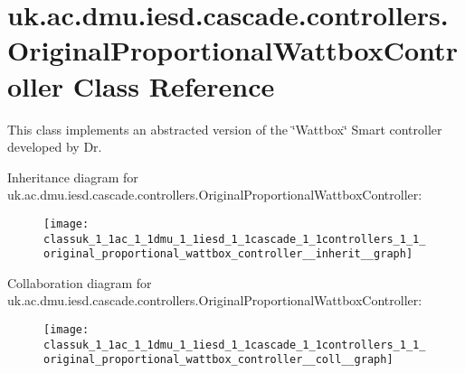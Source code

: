 \hypertarget{classuk_1_1ac_1_1dmu_1_1iesd_1_1cascade_1_1controllers_1_1_original_proportional_wattbox_controller}{\section{uk.\-ac.\-dmu.\-iesd.\-cascade.\-controllers.\-Original\-Proportional\-Wattbox\-Controller Class Reference}
\label{classuk_1_1ac_1_1dmu_1_1iesd_1_1cascade_1_1controllers_1_1_original_proportional_wattbox_controller}
}


This class implements an abstracted version of the \char`\"{}\-Wattbox\char`\"{} Smart controller developed by Dr.  




Inheritance diagram for uk.\-ac.\-dmu.\-iesd.\-cascade.\-controllers.\-Original\-Proportional\-Wattbox\-Controller\-:\nopagebreak
\begin{figure}[H]
\begin{center}
\leavevmode
\texttt{[image: classuk\_1\_1ac\_1\_1dmu\_1\_1iesd\_1\_1cascade\_1\_1controllers\_1\_1\_original\_proportional\_wattbox\_controller\_\_inherit\_\_graph]}
\end{center}
\end{figure}


Collaboration diagram for uk.\-ac.\-dmu.\-iesd.\-cascade.\-controllers.\-Original\-Proportional\-Wattbox\-Controller\-:\nopagebreak
\begin{figure}[H]
\begin{center}
\leavevmode
\texttt{[image: classuk\_1\_1ac\_1\_1dmu\_1\_1iesd\_1\_1cascade\_1\_1controllers\_1\_1\_original\_proportional\_wattbox\_controller\_\_coll\_\_graph]}
\end{center}
\end{figure}
